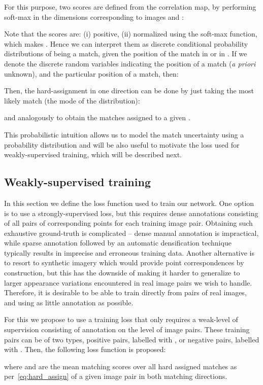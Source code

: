 \documentclass{article}
\begin{document}
For this purpose, two scores are defined from the correlation map, by performing soft-max in the dimensions corresponding to images  and :

Note that the scores are: (i) positive, (ii) normalized using the soft-max function, which makes . Hence we can interpret them as discrete conditional probability distributions of  being a match, given the position  of the match in  or  in . If we denote  the discrete random variables indicating the position of a match (\emph{a priori} unknown), and  the particular position of a match, then:

Then, the hard-assignment in one direction can be done by just taking the most likely match (the mode of the distribution):

and analogously to obtain the matches  assigned to a given .

This probabilistic intuition allows us to model the match uncertainty using a probability distribution and  will be also useful to motivate the loss used for weakly-supervised training, which will be described next.

\subsection{Weakly-supervised training}
In this section we define the loss function used to train our network.
One option is to use a strongly-supervised loss, but this requires dense annotations consisting of all pairs of corresponding points for each training image pair. Obtaining such exhaustive ground-truth is complicated -- dense manual annotation is impractical, while sparse annotation followed by an automatic densification technique typically results in imprecise and erroneous training data. Another alternative is to resort to synthetic imagery which would provide point correspondences by construction, but this has the downside of making it harder to generalize to larger appearance variations encountered in real image pairs we wish to handle. Therefore, it is desirable to be able to train directly from pairs of real images, and using as little annotation as possible. 

For this we propose to use a training loss that only requires a weak-level of supervision consisting of annotation on the level of image pairs.  These training pairs  can be of two types, positive pairs, labelled with , or negative pairs, labelled with . Then, the following loss function is proposed:

where  and  are the mean matching scores over all hard assigned matches as per~\eqref{eq:hard_assign} of a given image pair  in both matching directions.
\end{document}

